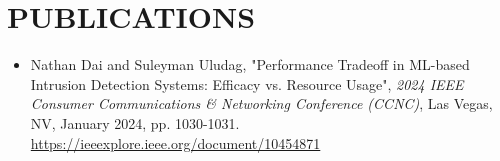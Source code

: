 \section*{PUBLICATIONS}
\noindent
\begin{itemize}
	\item Nathan Dai and Suleyman Uludag, "Performance Tradeoff in ML-based Intrusion Detection Systems: Efficacy vs. Resource Usage", \textit{2024 IEEE Consumer Communications \& Networking Conference (CCNC)}, Las Vegas, NV, January 2024, pp. 1030-1031. \href{https://ieeexplore.ieee.org/document/10454871}{https://ieeexplore.ieee.org/document/10454871}
\end{itemize}
